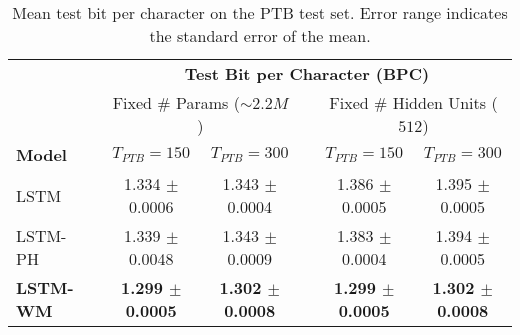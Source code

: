 \begin{table*}[t]
    \centering
    \caption{Mean test bit per character on the PTB test set. Error range indicates the standard error of the mean.}
    \footnotesize
    \begin{tabular}{lcccccc}
    \toprule
            & & \multicolumn{5}{c}{\textbf{Test Bit per Character (BPC)}} \\
    \cmidrule{3-7}
            & & \multicolumn{2}{c}{Fixed \# Params ($\sim 2.2M$)} & & \multicolumn{2}{c}{Fixed \# Hidden Units ($512$)} \\
    \textbf{Model}   & & $T_{PTB}=150$ & $T_{PTB}=300$ & & $T_{PTB}=150$ & $T_{PTB}=300$ \\
    \cmidrule{1-1}
    \cmidrule{3-4}
    \cmidrule{6-7}
    LSTM    & & 1.334 $\pm$ 0.0006 & 1.343 $\pm$ 0.0004 & & 1.386 $\pm$ 0.0005 & 1.395 $\pm$ 0.0005 \\
    LSTM-PH & & 1.339 $\pm$ 0.0048 & 1.343 $\pm$ 0.0009 & & 1.383 $\pm$ 0.0004 & 1.394 $\pm$ 0.0005 \\
    \textbf{LSTM-WM} & & \textbf{1.299 $\pm$ 0.0005} & \textbf{1.302 $\pm$ 0.0008} & & \textbf{1.299 $\pm$ 0.0005} & \textbf{1.302 $\pm$ 0.0008} \\
    \bottomrule
    \end{tabular}
    \label{tab:ptb_lm}
\end{table*}